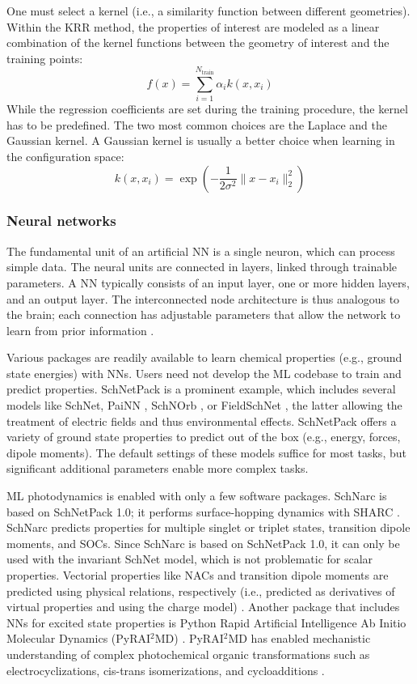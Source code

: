 \documentclass[9pt,bestpractices]{livecoms}
\begin{document}
One must select a kernel (i.e., a similarity function between different geometries). Within the KRR method, the properties of interest are modeled as a linear combination of the kernel functions between the geometry of interest and the training points:
\begin{equation}
f(x) = \sum_{i=1}^{N_\text{train}} \alpha_i k(x, x_i)
\end{equation}
While the regression coefficients are set during the training procedure, the kernel has to be predefined. The two most common choices are the Laplace and the Gaussian kernel. A Gaussian kernel is usually a better choice when learning in the configuration space:
\begin{equation}
k(x, x_i) = \exp\left(-\frac{1}{2\sigma^2} \| x-x_i \|_2^2\right)
\end{equation}

\subsubsection{Neural networks}
\label{sec:nn}
The fundamental unit of an artificial NN is a single neuron, which can process simple data. The neural units are connected in layers, linked through trainable parameters. A NN typically consists of an input layer, one or more hidden layers, and an output layer. The interconnected node architecture is thus analogous to the brain; each connection has adjustable parameters that allow the network to learn from prior information \cite{RN119, RN155}.

Various packages are readily available to learn chemical properties (e.g., ground state energies) with NNs. Users need not develop the ML codebase to train and predict properties. SchNetPack \cite{RN114} is a prominent example, which includes several models like SchNet,\cite{RN136} PaiNN \cite{Schutt21}, SchNOrb \cite{RN92}, or FieldSchNet \cite{RN146}, the latter allowing the treatment of electric fields and thus environmental effects. SchNetPack offers a variety of ground state properties to predict out of the box (e.g., energy, forces, dipole moments). The default settings of these models suffice for most tasks, but significant additional parameters enable more complex tasks. 

ML photodynamics is enabled with only a few software packages. SchNarc \cite{RN103, RN142} is based on SchNetPack 1.0; it performs surface-hopping dynamics with SHARC \cite{RN139}. SchNarc predicts properties for multiple singlet or triplet states, transition dipole moments, and SOCs. Since SchNarc is based on SchNetPack 1.0, it can only be used with the invariant SchNet model, which is not problematic for scalar properties. Vectorial properties like NACs and transition dipole moments are predicted using physical relations, respectively (i.e., predicted as derivatives of virtual properties and using the charge model) \cite{RN147}. Another package that includes NNs for excited state properties is Python Rapid Artificial Intelligence Ab Initio Molecular Dynamics (PyRAI$^2$MD) \cite{RN121}. PyRAI$^2$MD has enabled mechanistic understanding of complex photochemical organic transformations such as electrocyclizations, cis-trans isomerizations, and cycloadditions \cite{RN140, RN46}.
\end{document}
